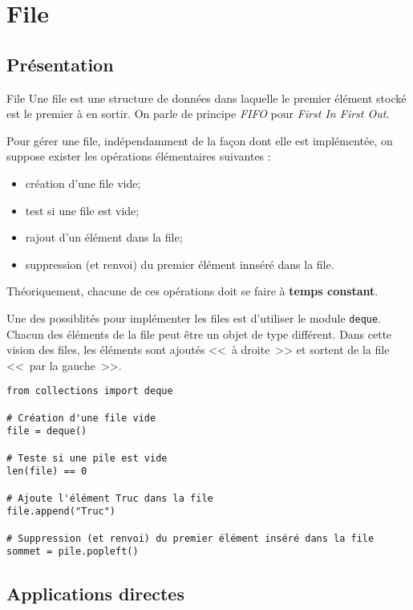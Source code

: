 \section{File}
\subsection{Présentation}
\begin{defi}{File}
Une file est une structure de données dans laquelle le premier élément stocké est le premier à en sortir. On parle de principe \textit{FIFO} pour \textit{First In First Out}. 
\end{defi}

Pour gérer une file, indépendamment de la façon dont elle est implémentée, on suppose exister les opérations élémentaires suivantes : 
\begin{itemize}
\item création d'une file vide;
\item test si une file est vide;
\item rajout d'un élément dans la file;
\item suppression (et renvoi) du premier élément innséré dans la file.
\end{itemize}

Théoriquement, chacune de ces opérations doit se faire à \textbf{temps constant}.

Une des possiblités pour implémenter les files est d'utiliser le module \texttt{deque}. Chacun des éléments de la file peut être un objet de type différent. Dans cette vision des files, les éléments sont ajoutés <<~à droite~>> et sortent de la file <<~par la gauche~>>.

\begin{lstlisting} 
from collections import deque

# Création d'une file vide
file = deque() 

# Teste si une pile est vide
len(file) == 0

# Ajoute l'élément Truc dans la file 
file.append("Truc")

# Suppression (et renvoi) du premier élément inséré dans la file
sommet = pile.popleft()

\end{lstlisting}


\subsection{Applications directes}

